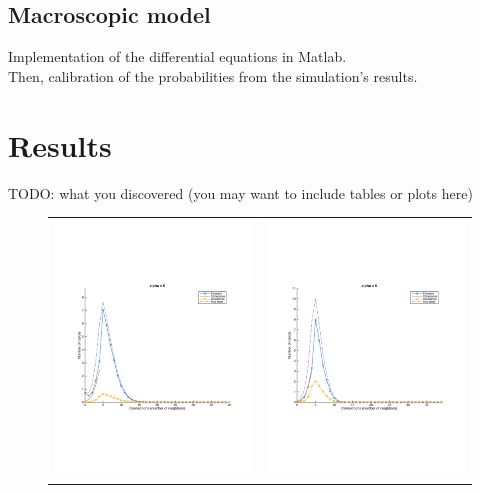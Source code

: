 \documentclass[a4paper, 10pt, conference]{ieeeconf}
\begin{document}
  \subsection{Macroscopic model}
  Implementation of the differential equations in Matlab.\\
  Then, calibration of the probabilities from the simulation's results.

\section{Results}
  TODO: what you discovered (you may want to include tables or plots here)\\

  \begin{figure}[p]
    \begin{center}
      \begin{tabular}{lr}
        \includegraphics[width=8cm]{figures/simulation-40-alpha-5.pdf}   &
        \includegraphics[width=8cm]{figures/macroscopic-40-alpha-5.pdf}  \\

\end{tabular}
\end{center}
\end{figure}
\end{document}
